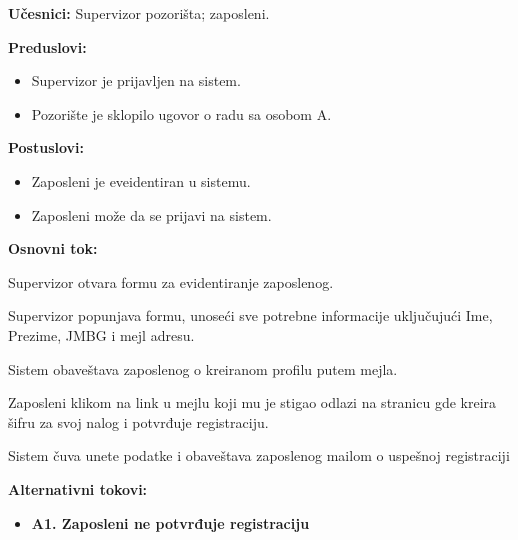 \documentclass[a4paper]{article}
\begin{document}
\noindent\textbf{Učesnici:} Supervizor pozorišta; zaposleni.

\noindent\textbf{Preduslovi:}
  \begin{itemize}
    \item Supervizor je prijavljen na sistem.
    \item Pozorište je sklopilo ugovor o radu sa osobom A.
  \end{itemize}

\noindent\textbf{Postuslovi:} 
  \begin{itemize}
    \item Zaposleni je eveidentiran u sistemu.
    \item Zaposleni može da se prijavi na sistem.
  \end{itemize}

\noindent\textbf{Osnovni tok:}
  \begin{legal}
    \item Supervizor otvara formu za evidentiranje zaposlenog.
    \item Supervizor popunjava formu, unoseći sve potrebne informacije uključujući Ime, Prezime, JMBG i mejl adresu. 
    \item Sistem obaveštava zaposlenog o kreiranom profilu putem mejla. 
    \item Zaposleni klikom na link u mejlu koji mu je stigao odlazi na stranicu gde kreira šifru za svoj nalog i potvrđuje registraciju.  
    \item Sistem čuva unete podatke i obaveštava zaposlenog mailom o uspešnoj registraciji
  \end{legal}

\noindent\textbf{Alternativni tokovi:} 
\begin{itemize}
  \item \textbf{A1. Zaposleni ne potvrđuje registraciju} 
\end{itemize}
\end{document}
